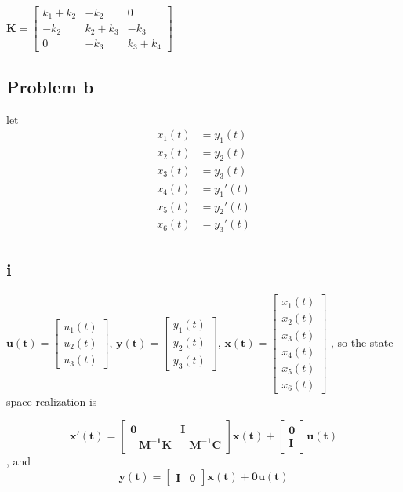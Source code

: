 \documentclass[12pt,a4paper]{article}
\begin{document}
$
\mathbf{K} = \begin{bmatrix}
    k_1+k_2         & -k_2             & 0              \\
    -k_2            & k_2+k_3         & -k_3       \\
    0               & -k_3           & k_3+k_4
\end{bmatrix}
$

\subsection*{Problem b}
let
\[
    \begin{aligned}
        x_1(t) &= y_1(t) \\
        x_2(t) &= y_2(t) \\
        x_3(t) &= y_3(t) \\
        x_4(t) &= y_1'(t) \\
        x_5(t) &= y_2'(t) \\
        x_6(t) &= y_3'(t)
    \end{aligned}
\]
\subsection*{i}

$\mathbf{u(t)} = \begin{bmatrix}
    u_1(t)\\
    u_2(t) \\
    u_3(t)
\end{bmatrix}
$, $\mathbf{y(t)} = \begin{bmatrix}
    y_1(t)\\
    y_2(t)\\
    y_3(t)
\end{bmatrix}
$, $\mathbf{x(t)} = \begin{bmatrix}
    x_1(t)\\
    x_2(t)\\
    x_3(t)\\
    x_4(t)\\
    x_5(t)\\
    x_6(t)
\end{bmatrix}
$
, so the state-space realization is

\[
    \mathbf{x'(t)} = \begin{bmatrix}
        \mathbf{0} & \mathbf{I}\\
        \mathbf{-\mathbf{M}^{-1}\mathbf{K}} & \mathbf{-\mathbf{M}^{-1}\mathbf{\mathbf{C}}}
    \end{bmatrix}
    \mathbf{x(t)}+ \begin{bmatrix}
        \mathbf{0}\\
        \mathbf{I}
    \end{bmatrix}\mathbf{u(t)}
\], and
\[
    \mathbf{y(t)} = \begin{bmatrix}
        \mathbf{I} & \mathbf{0}
    \end{bmatrix}
    \mathbf{x(t)} + 
        \mathbf{0}\mathbf{u(t)}
\]
\end{document}
